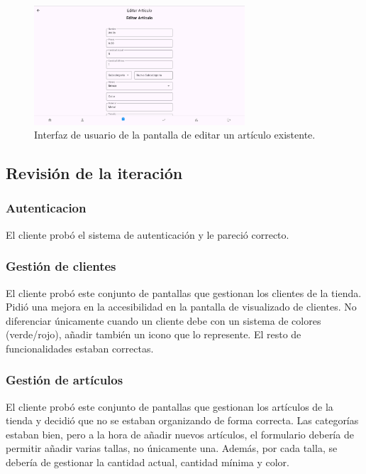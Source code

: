 \begin{figure}[H]
	\centering
	\includegraphics[width=0.7\textwidth]{imagenes/PrimeraIteracion/editarArticulo.png}
	\caption{Interfaz de usuario de la pantalla de editar un artículo existente.}
	\label{fig:appEditarArticulo}
\end{figure}


\subsection{Revisión de la iteración}

\subsubsection{Autenticacion}

El cliente probó el sistema de autenticación y le pareció correcto. 

\subsubsection{Gestión de clientes}

El cliente probó este conjunto de pantallas que gestionan los clientes de la tienda. Pidió una mejora en la accesibilidad en la pantalla de visualizado de clientes. No diferenciar únicamente cuando un cliente debe con un sistema de colores (verde/rojo), añadir también un icono que lo represente. El resto de funcionalidades estaban correctas. 

\subsubsection{Gestión de artículos}

El cliente probó este conjunto de pantallas que gestionan los artículos de la tienda y decidió que no se estaban organizando de forma correcta. Las categorías estaban bien, pero a la hora de añadir nuevos artículos, el formulario debería de permitir añadir varias tallas, no únicamente una. Además, por cada talla, se debería de gestionar la cantidad actual, cantidad mínima y color. 

